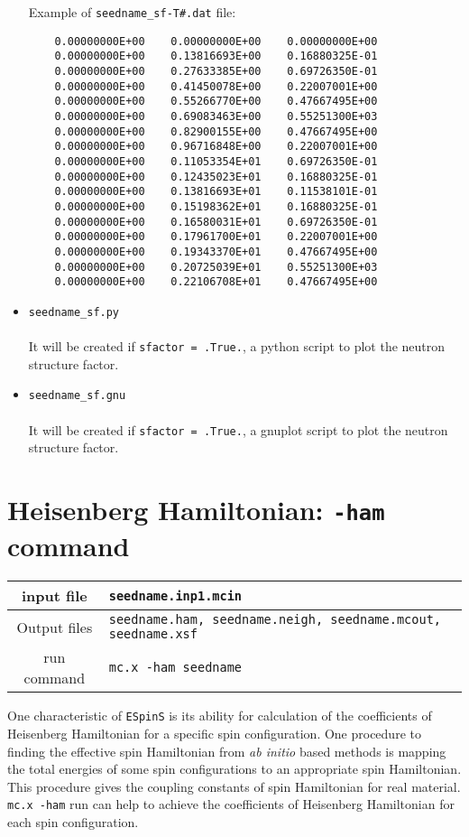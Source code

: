 \documentclass[10pt]{report}
\begin{document}
\begin{itemize}
Example of {\tt seedname\_sf-T\#.dat}  file:
{\scriptsize    
\begin{verbatim}
    0.00000000E+00    0.00000000E+00    0.00000000E+00
    0.00000000E+00    0.13816693E+00    0.16880325E-01
    0.00000000E+00    0.27633385E+00    0.69726350E-01
    0.00000000E+00    0.41450078E+00    0.22007001E+00
    0.00000000E+00    0.55266770E+00    0.47667495E+00
    0.00000000E+00    0.69083463E+00    0.55251300E+03
    0.00000000E+00    0.82900155E+00    0.47667495E+00
    0.00000000E+00    0.96716848E+00    0.22007001E+00
    0.00000000E+00    0.11053354E+01    0.69726350E-01
    0.00000000E+00    0.12435023E+01    0.16880325E-01
    0.00000000E+00    0.13816693E+01    0.11538101E-01
    0.00000000E+00    0.15198362E+01    0.16880325E-01
    0.00000000E+00    0.16580031E+01    0.69726350E-01
    0.00000000E+00    0.17961700E+01    0.22007001E+00
    0.00000000E+00    0.19343370E+01    0.47667495E+00
    0.00000000E+00    0.20725039E+01    0.55251300E+03
    0.00000000E+00    0.22106708E+01    0.47667495E+00
\end{verbatim}
}
\item {\tt seedname\_sf.py}\\\\    
 It will be created if {\tt sfactor = .True.}, 
a python script to plot the neutron structure factor.
\item {\tt seedname\_sf.gnu}\\\\    
 It will be created  if {\tt sfactor = .True.}, a gnuplot script to plot the neutron structure factor.
\end{itemize}
\chapter{Heisenberg Hamiltonian: {\tt -ham} command}
\begin{center}
\begin{tabular}{|c|p{10cm}|}
\toprule
\hline
input file   & {\tt seedname.inp1.mcin}\\
\hline
Output files & {\tt seedname.ham, seedname.neigh, seedname.mcout, seedname.xsf}\\
\hline
run command  & {\tt mc.x -ham seedname}\\
\hline
\bottomrule
\end{tabular}
\end{center}
One characteristic of {\tt ESpinS} is its ability for calculation of the coefficients of Heisenberg Hamiltonian
for a specific spin configuration. One procedure to finding the effective spin Hamiltonian from {\it ab initio} based methods 
is mapping the total energies of some spin configurations to
an appropriate spin Hamiltonian. This procedure gives the coupling constants of spin Hamiltonian for real
material. {\tt mc.x -ham} run can help to achieve the coefficients of Heisenberg Hamiltonian for each spin configuration.
\end{document}
